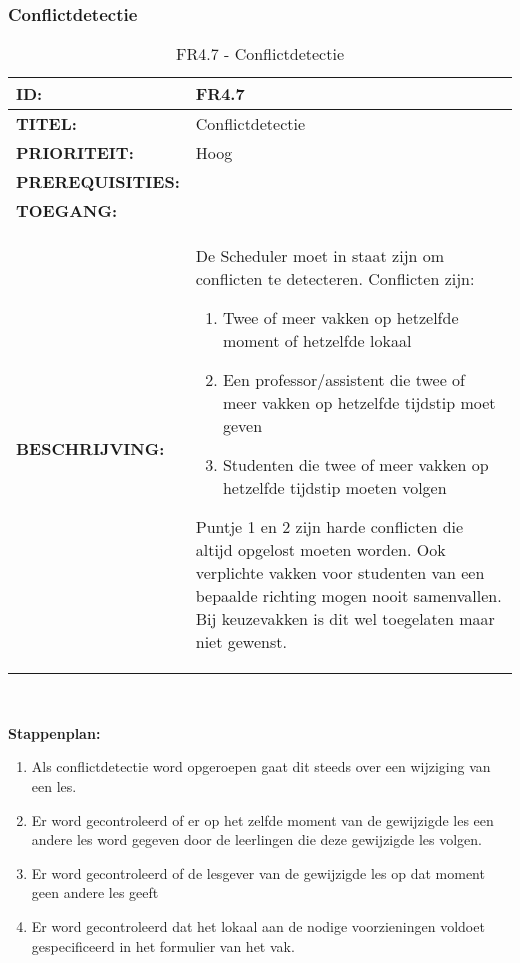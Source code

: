 \subsubsection{Conflictdetectie}        
\noindent\begin{table}[H]
            \begin{tabular}{l | p{10cm}}
                \textbf{ID:} & FR4.7 \\ \hline
                \textbf{TITEL:} & Conflictdetectie\\ \hline
                \textbf{PRIORITEIT:} & Hoog \\ \hline
                \textbf{PREREQUISITIES:} & \\ \hline
                \textbf{TOEGANG:} &  \\ \hline
                \textbf{BESCHRIJVING:} & De Scheduler moet in staat zijn om conflicten te detecteren. Conflicten zijn: 
                \begin{enumerate}
                \item Twee of meer vakken op hetzelfde moment of hetzelfde lokaal
                \item Een professor/assistent  die twee of meer vakken op hetzelfde tijdstip moet geven 
                \item Studenten die twee of meer vakken op hetzelfde tijdstip moeten volgen
                \end{enumerate}
                Puntje 1 en 2 zijn harde conflicten die altijd opgelost moeten worden. Ook verplichte vakken voor studenten van een bepaalde richting mogen nooit samenvallen. Bij keuzevakken is dit wel toegelaten maar niet gewenst.\\
            \end{tabular}\\
            \caption{FR4.7 - Conflictdetectie}
            \label{tab:FR4.7 - Conflictdetectie}
        \end{table}
        
\textbf{Stappenplan:}
	\begin{enumerate}
	\item Als conflictdetectie word opgeroepen gaat dit steeds over een wijziging van een les.
	\item Er word gecontroleerd of er op het zelfde moment van de gewijzigde les een andere les word gegeven door de leerlingen die deze gewijzigde les volgen.
	\item Er word gecontroleerd of de lesgever van de gewijzigde les op dat moment geen andere les geeft
	\item Er word gecontroleerd dat het lokaal aan de nodige voorzieningen voldoet gespecificeerd in het formulier van het vak. 
	\end{enumerate}
	


\clearpage